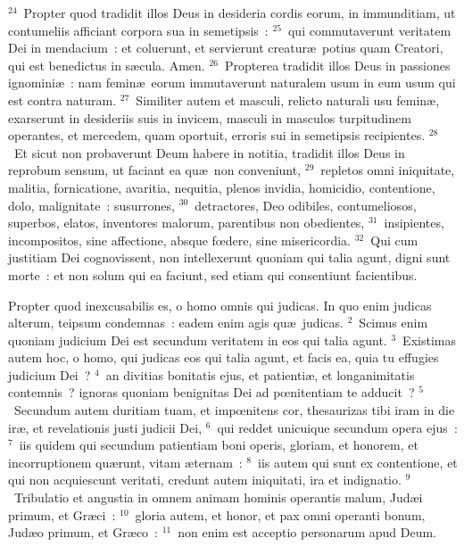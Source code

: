 ${}^{24}$~Propter quod tradidit illos Deus in desideria cordis eorum, in immunditiam, ut contumeliis afficiant corpora sua in semetipsis~:
${}^{25}$~qui commutaverunt veritatem Dei in mendacium~: et coluerunt, et servierunt creatur\ae\ potius quam Creatori, qui est benedictus in s\ae cula. Amen.
${}^{26}$~Propterea tradidit illos Deus in passiones ignomini\ae~: nam femin\ae\ eorum immutaverunt naturalem usum in eum usum qui est contra naturam.
${}^{27}$~Similiter autem et masculi, relicto naturali usu femin\ae , exarserunt in desideriis suis in invicem, masculi in masculos turpitudinem operantes, et mercedem, quam oportuit, erroris sui in semetipsis recipientes.
${}^{28}$~Et sicut non probaverunt Deum habere in notitia, tradidit illos Deus in reprobum sensum, ut faciant ea qu\ae\ non conveniunt,
${}^{29}$~repletos omni iniquitate, malitia, fornicatione, avaritia, nequitia, plenos invidia, homicidio, contentione, dolo, malignitate~: susurrones,
${}^{30}$~detractores, Deo odibiles, contumeliosos, superbos, elatos, inventores malorum, parentibus non obedientes,
${}^{31}$~insipientes, incompositos, sine affectione, absque fœdere, sine misericordia.
${}^{32}$~Qui cum justitiam Dei cognovissent, non intellexerunt quoniam qui talia agunt, digni sunt morte~: et non solum qui ea faciunt, sed etiam qui consentiunt facientibus.

\lettrine[lines=10,image=true,loversize=0.05,lraise=-0.03]{P}{}ropter quod inexcusabilis es, o homo omnis qui judicas. In quo enim judicas alterum, teipsum condemnas~: eadem enim agis qu\ae\ judicas.
${}^{2}$~Scimus enim quoniam judicium Dei est secundum veritatem in eos qui talia agunt.
${}^{3}$~Existimas autem hoc, o homo, qui judicas eos qui talia agunt, et facis ea, quia tu effugies judicium Dei~?
${}^{4}$~an divitias bonitatis ejus, et patienti\ae , et longanimitatis contemnis~? ignoras quoniam benignitas Dei ad pœnitentiam te adducit~?
${}^{5}$~Secundum autem duritiam tuam, et impœnitens cor, thesaurizas tibi iram in die ir\ae , et revelationis justi judicii Dei,
${}^{6}$~qui reddet unicuique secundum opera ejus~:
${}^{7}$~iis quidem qui secundum patientiam boni operis, gloriam, et honorem, et incorruptionem qu\ae runt, vitam \ae ternam~:
${}^{8}$~iis autem qui sunt ex contentione, et qui non acquiescunt veritati, credunt autem iniquitati, ira et indignatio.
${}^{9}$~Tribulatio et angustia in omnem animam hominis operantis malum, Jud\ae i primum, et Gr\ae ci~:
${}^{10}$~gloria autem, et honor, et pax omni operanti bonum, Jud\ae o primum, et Gr\ae co~:
${}^{11}$~non enim est acceptio personarum apud Deum.


